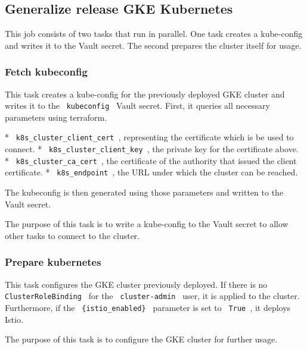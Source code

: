 \subsection{Generalize release GKE Kubernetes}\label{subsec:generalize-release-gke-kubernetes}

This job consists of two tasks that run in parallel.
One task creates a kube-config and writes it to the Vault secret.
The second prepares the cluster itself for usage.

\subsubsection{Fetch kubeconfig}\label{subsubsec:fetch-kubeconfig}

This task creates a kube-config for the previously deployed GKE cluster and writes it to the \verb| kubeconfig | Vault secret.
First, it queries all necessary parameters using terraform.

* \verb| k8s_cluster_client_cert |, representing the certificate which is be used to connect.
* \verb| k8s_cluster_client_key |, the private key for the certificate above.
*  \verb| k8s_cluster_ca_cert |, the certificate of the authority that issued the client certificate.
*  \verb| k8s_endpoint |, the URL under which the cluster can be reached.

The kubeconfig is then generated using those parameters and written to the Vault secret.

The purpose of this task is to write a kube-config to the Vault secret to allow other tasks to connect to the cluster.

\subsubsection{Prepare kubernetes}\label{subsubsec:prepare-kubernetes}

This task configures the GKE cluster previously deployed.
If there is no \verb| ClusterRoleBinding | for the \verb| cluster-admin | user, it is applied to the cluster.
Furthermore, if the \verb| {istio_enabled} | parameter is set to \verb| True |, it deploys Istio.

The purpose of this task is to configure the GKE cluster for further usage.
